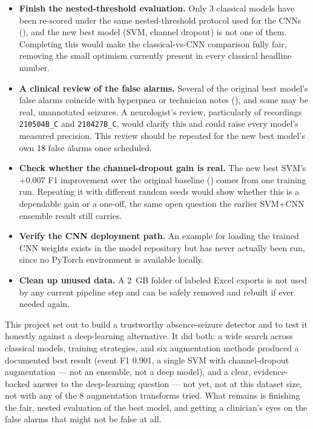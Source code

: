 \begin{itemize}[leftmargin=1.4em]
  \item \textbf{Finish the nested-threshold evaluation.} Only 3 classical models have been
    re-scored under the same nested-threshold protocol used for the CNNs (),
    and the new best model (SVM, channel dropout) is not one of them. Completing this would make
    the classical-vs-CNN comparison fully fair, removing the small optimism currently present in
    every classical headline number.
  \item \textbf{A clinical review of the false alarms.} Several of the original best model's
    false alarms coincide with hyperpnea or technician notes (), and some
    may be real, unannotated seizures. A neurologist's review, particularly of recordings
    \texttt{210504B\_C} and \texttt{210427B\_C}, would clarify this and could raise every model's
    measured precision. This review should be repeated for the new best model's own 18 false
    alarms once scheduled.
  \item \textbf{Check whether the channel-dropout gain is real.} The new best SVM's +0.007 F1
    improvement over the original baseline () comes from one training
    run. Repeating it with different random seeds would show whether this is a dependable gain
    or a one-off, the same open question the earlier SVM+CNN ensemble result still carries.
  \item \textbf{Verify the CNN deployment path.} An example for loading the trained CNN weights
    exists in the model repository but has never actually been run, since no PyTorch environment
    is available locally.
  \item \textbf{Clean up unused data.} A 2~GB folder of labeled Excel exports is not used by any
    current pipeline step and can be safely removed and rebuilt if ever needed again.
\end{itemize}

\begin{summarybox}
This project set out to build a trustworthy absence-seizure detector and to test it honestly
against a deep-learning alternative. It did both: a wide search across classical models,
training strategies, and six augmentation methods produced a documented best result (event F1
0.901, a single SVM with channel-dropout augmentation --- not an ensemble, not a deep model), and
a clear, evidence-backed answer to the deep-learning question --- not yet, not at this dataset
size, not with any of the 8 augmentation transforms tried. What remains is finishing the fair,
nested evaluation of the best model, and getting a clinician's eyes on the false alarms that
might not be false at all.
\end{summarybox}
